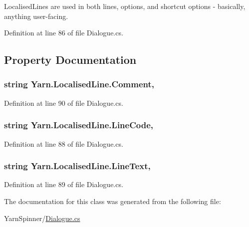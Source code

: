 Localised\-Lines are used in both lines, options, and shortcut options -\/ basically, anything user-\/facing. 

Definition at line 86 of file Dialogue.\-cs.



\subsection{Property Documentation}
\hypertarget{a00128_afbfb834bb1623653fa73945c221c4b9d}{
\subsubsection[{Comment}]{\setlength{\rightskip}{0pt plus 5cm}string Yarn.\-Localised\-Line.\-Comment\hspace{0.3cm}{\ttfamily [get]}, {\ttfamily [set]}}}\label{a00128_afbfb834bb1623653fa73945c221c4b9d}


Definition at line 90 of file Dialogue.\-cs.

\hypertarget{a00128_aad88f588cbbe2df9bb83da59eeff3d3c}{
\subsubsection[{Line\-Code}]{\setlength{\rightskip}{0pt plus 5cm}string Yarn.\-Localised\-Line.\-Line\-Code\hspace{0.3cm}{\ttfamily [get]}, {\ttfamily [set]}}}\label{a00128_aad88f588cbbe2df9bb83da59eeff3d3c}


Definition at line 88 of file Dialogue.\-cs.

\hypertarget{a00128_ab0b4fa82cfa7693ff3c96fe5c3837fff}{
\subsubsection[{Line\-Text}]{\setlength{\rightskip}{0pt plus 5cm}string Yarn.\-Localised\-Line.\-Line\-Text\hspace{0.3cm}{\ttfamily [get]}, {\ttfamily [set]}}}\label{a00128_ab0b4fa82cfa7693ff3c96fe5c3837fff}


Definition at line 89 of file Dialogue.\-cs.



The documentation for this class was generated from the following file\-:\begin{DoxyCompactItemize}
\item 
Yarn\-Spinner/\hyperlink{a00296}{Dialogue.\-cs}\end{DoxyCompactItemize}
